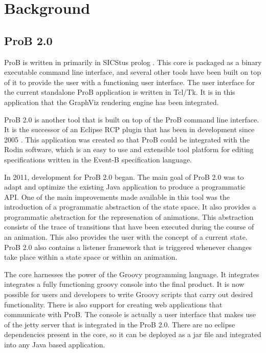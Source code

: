 \section{Background}

\subsection{ProB 2.0}

ProB is written in primarily in SICStus prolog \cite{LeBu08_225}. This core is packaged as a binary executable command line interface, and several other tools have been built on top of it to provide the user with a functioning user interface. The user interface for the current standalone ProB application is written in Tcl/Tk. It is in this application that the GraphViz rendering engine has been integrated. 

ProB 2.0 is another tool that is built on top of the ProB command line interface. It is the successor of an Eclipse RCP plugin that has been in development since 2005 \cite{BuHa07_292}. This application was created so that ProB could be integrated with the Rodin software, which is an easy to use and extensible tool platform for editing specifications written in the Event-B specification language.

In 2011, development for ProB 2.0 began. The main goal of ProB 2.0 was to adapt and optimize the existing Java application to produce a programmatic API. One of the main improvements made available in this tool was the introduction of a programmatic abstraction of the state space. It also provides a programmatic abstraction for the represenation of animations. This abstraction consists of the trace of transitions that have been executed during the course of an animation. This also provides the user with the concept of a current state. ProB 2.0 also contains a listener framework that is triggered whenever changes take place within a state space or within an animation.

The core harnesses the power of the Groovy programming language. It integrates integrates a fully functioning groovy console into the final product. It is now possible for users and developers to write Groovy scripts that carry out desired functionality. There is also support for creating web applications that communicate with ProB. The console is actually a user interface that makes use of the jetty server that is integrated in the ProB 2.0. There are no eclipse dependencies present in the core, so it can be deployed as a jar file and integrated into any Java based application.

